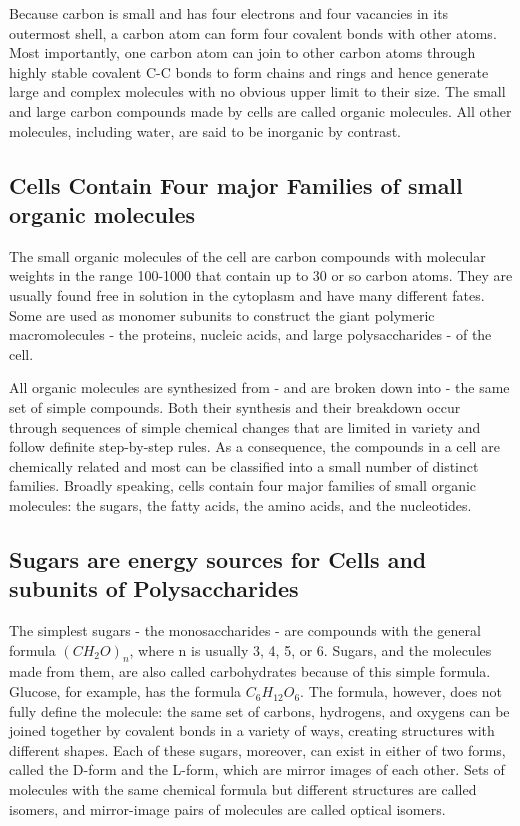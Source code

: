 Because carbon is small
and has four electrons and four vacancies in its outermost shell, a carbon
atom can form four covalent bonds with other atoms. Most importantly,
one carbon atom can join to other carbon atoms through highly stable
covalent C-C bonds to form chains and rings and hence generate large
and complex molecules with no obvious upper limit to their size.
The small and large carbon compounds made by
cells are called organic molecules. All other molecules, including water,
are said to be inorganic by contrast.

\subsection{Cells Contain Four major Families of small organic molecules}

The small organic molecules of the cell are carbon compounds with
molecular weights in the range 100-1000 that contain up to 30 or so carbon
atoms. They are usually found free in solution in the cytoplasm and
have many different fates. Some are used as monomer subunits to construct
the giant polymeric macromolecules - the proteins, nucleic acids,
and large polysaccharides - of the cell.

All organic molecules are synthesized from - and are broken down
into - the same set of simple compounds. Both their synthesis and their
breakdown occur through sequences of simple chemical changes that
are limited in variety and follow definite step-by-step rules. As a consequence,
the compounds in a cell are chemically related and most can be
classified into a small number of distinct families. Broadly speaking, cells
contain four major families of small organic molecules: the sugars, the
fatty acids, the amino acids, and the nucleotides.

\subsection{Sugars are energy sources for Cells and subunits of Polysaccharides}

The simplest sugars - the monosaccharides - are compounds with the
general formula $(CH_{2}O)_{n}$, where n is usually 3, 4, 5, or 6. Sugars, and
the molecules made from them, are also called carbohydrates because
of this simple formula. Glucose, for example, has the formula $C_{6}H_{12}O_{6}$.
The formula, however, does not fully define the molecule:
the same set of carbons, hydrogens, and oxygens can be joined together
by covalent bonds in a variety of ways, creating structures with different
shapes.
Each of these sugars, moreover, can exist in either of two forms, called
the D-form and the L-form, which are mirror images of each other. Sets
of molecules with the same chemical formula but different structures are
called isomers, and mirror-image pairs of molecules are called optical isomers.

